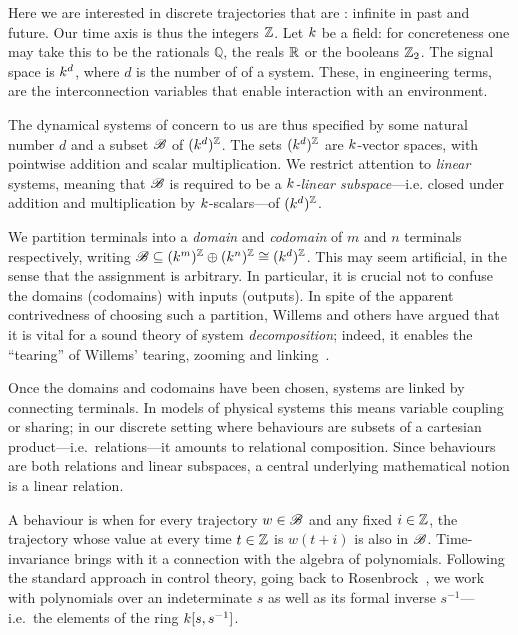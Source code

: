 Here we are interested in discrete trajectories that are :
infinite in past and future.  Our time axis is thus the integers ${\mathbb Z}$.  Let $k$
be a field: for concreteness one may take this to be the rationals $\mathbb{Q}$,
the reals ${\mathbb{R}}$ or the booleans ${\mathbb Z}_2$.  The signal space is $k^d$, where $d$ is
the number of  of a system.  These, in engineering terms, are
the interconnection variables that enable interaction with an environment.

The dynamical systems of concern to us are thus specified by some natural number
$d$ and a subset ${\mathscr B}$ of $(k^d)^{\mathbb Z}$. The sets $(k^d)^{\mathbb Z}$ are $k$-vector
spaces, with pointwise addition and scalar multiplication. We restrict attention
to \emph{linear} systems, meaning that ${\mathscr B}$ is required to be a \emph{$k$-linear subspace}---i.e.
closed under addition and multiplication by $k$-scalars---of
$(k^d)^{\mathbb Z}$. 

We partition terminals into a \emph{domain} and \emph{codomain} of $m$ and $n$
terminals respectively, writing ${\mathscr B} \subseteq (k^m)^{\mathbb Z} \oplus (k^n)^{\mathbb Z} \cong
(k^d)^{\mathbb Z}$.  This may seem artificial, in the sense that the assignment is
arbitrary.  In particular, it is crucial not to confuse the domains (codomains)
with inputs (outputs). In spite of the apparent contrivedness of choosing such a
partition, Willems and others have argued that it is vital for a sound theory of
system \emph{decomposition}; indeed, it enables the ``tearing'' of Willems'
tearing, zooming and linking~\cite{Wi}.

Once the domains and codomains have been chosen, systems are linked by
connecting terminals. In models of physical systems this means variable coupling
or sharing; in our discrete setting where behaviours are subsets of a
cartesian product---i.e.\ relations---it amounts to relational composition.
Since behaviours are both relations and linear subspaces, a central underlying
mathematical notion is a linear relation.  

\smallskip
A behaviour is  when for every trajectory $w \in {\mathscr B}$ and
any fixed $i\in{\mathbb Z}$, the trajectory whose value at every time $t\in{\mathbb Z}$ is
$w(t+i)$ is also in ${\mathscr B}$.  
%
Time-invariance brings with it a connection with the algebra of polynomials.
Following the standard approach in control theory, going back to
Rosenbrock~\cite{Ro}, we work with polynomials over an indeterminate $s$ as well
as its formal inverse $s^{-1}$---i.e.\ the elements of the ring
${k[s,s^{-1}]}$.


